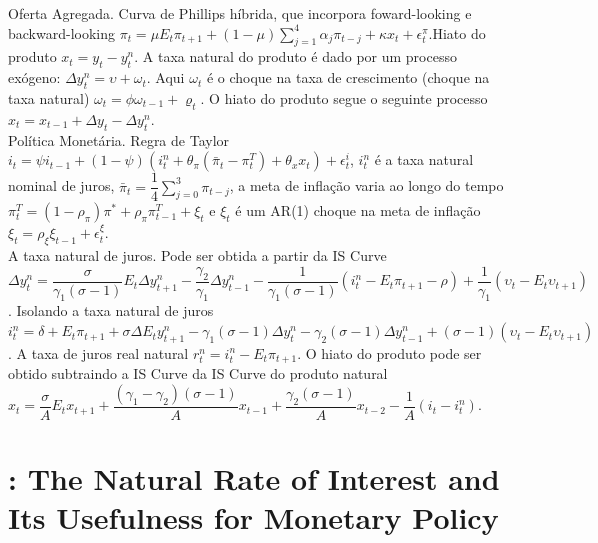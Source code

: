 Oferta Agregada. Curva de Phillips híbrida, que incorpora foward-looking e backward-looking $\pi_t = \mu E_t \pi_{t+1} + (1 - \mu) \sum_{j=1}^{4} \alpha_j \pi_{t-j} + \kappa x_t + \epsilon_t^{\pi} $.Hiato do produto $x_t = y_t - y_t^{n}$. A taxa natural do produto é dado por um processo exógeno: $\Delta y_t^{n} = \upsilon + \omega_t $. Aqui $\omega_t$ é o choque na taxa de crescimento (choque na taxa natural) $\omega_t = \phi \omega_{t-1} + \varrho_t $. O hiato do produto segue o seguinte processo $x_t = x_{t-1} + \Delta y_t - \Delta y_t^{n} $.\\

Política Monetária. Regra de Taylor $i_t = \psi i_{t-1} + (1 - \psi)(i_t^{n} + \theta_{\pi}(\bar{\pi}_t - \pi_t^{T}) + \theta_x x_t ) + \epsilon_t^{i} $, $i_t^{n}$ é a taxa natural nominal de juros, $\bar{\pi}_t = \dfrac{1}{4} \sum_{j=0}^{3} \pi_{t-j}$, a meta de inflação varia ao longo do tempo $\pi_t^{T} = (1 - \rho_{\pi}) \pi^{*} + \rho_{\pi}\pi_{t-1}^{T} + \xi_t$ e $\xi_t $ é um AR(1) choque na meta de inflação $\xi_t = \rho_{\xi}\xi_{t-1} + \epsilon_t^{\xi}$.\\

A taxa natural de juros. Pode ser obtida a partir da IS Curve $\Delta y_t^{n} = \dfrac{\sigma}{\gamma_1(\sigma -1 )}E_t \Delta y_{t+1}^{n} - \dfrac{\gamma_2}{\gamma_1}\Delta y_{t-1}^{n} - \dfrac{1}{\gamma_1 (\sigma -1)}(i_t^{n} - E_t \pi_{t+1} - \rho) + \dfrac{1}{\gamma_1}(\upsilon_t - E_t \upsilon_{t+1}) $. Isolando a taxa natural de juros $i_t^{n} = \delta + E_t \pi_{t+1} + \sigma \Delta E_t y_{t+1}^{n} - \gamma_1 (\sigma -1) \Delta y_t^{n} - \gamma_2(\sigma -1) \Delta y_{t-1}^{n} + (\sigma -1)(\upsilon_t - E_t \upsilon_{t+1}) $. A taxa de juros real natural $ r_t^{n} = i_t^{n} - E_t \pi_{t+1}$. O hiato do produto pode ser obtido subtraindo a IS Curve da IS Curve do produto natural $ x_t = \dfrac{\sigma}{A}E_t x_{t+1} + \dfrac{(\gamma_1 - \gamma_2)(\sigma -1 )}{A}x_{t-1} + \dfrac{\gamma_2(\sigma -1)}{A}x_{t-2} - \dfrac{1}{A}(i_t - i_t^{n}) $.
%
%
\section{\citet{Melosi:2015}: The Natural Rate of Interest and Its Usefulness for Monetary Policy }

